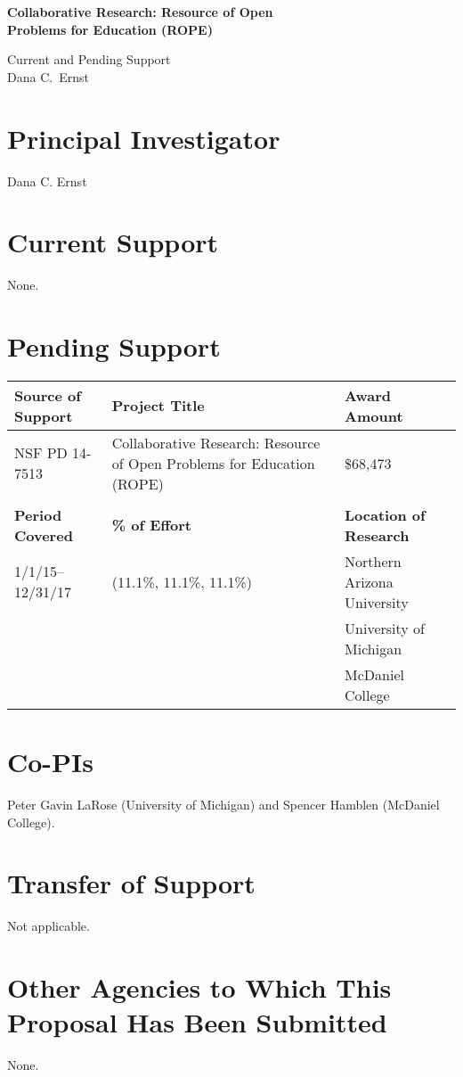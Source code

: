 \documentclass[11pt]{article}
\begin{document}
\begin{center}
{\Large \textbf{Collaborative Research: Resource of Open\\
Problems for Education (ROPE)}}

\bigskip

{\Large Current and Pending Support}\\
\smallskip
Dana C.~Ernst
\end{center}

\thispagestyle{empty}

\section{Principal Investigator}

\noindent Dana C. Ernst

\section{Current Support}

\noindent None.

\section{Pending Support}

\begin{tabularx}{6.4in}{@{}lXl}
\hline
\textbf{Source of Support} & \textbf{Project Title} & \textbf{Award Amount} \\
\hline
NSF PD 14-7513 & Collaborative Research: Resource of Open Problems for Education (ROPE) & \$68,473\\
\\
\hline
\textbf{Period Covered} & \textbf{\% of Effort} & \textbf{Location of Research} \\
\hline
1/1/15--12/31/17 \ \ & (11.1\%, 11.1\%, 11.1\%) \ & Northern Arizona University \\ 
&& University of Michigan \\
&& McDaniel College\\
\end{tabularx}

\section{Co-PIs}

\noindent Peter Gavin LaRose (University of Michigan) and Spencer Hamblen (McDaniel College).

\section{Transfer of Support}

\noindent Not applicable.

\section{Other Agencies to Which This Proposal Has Been Submitted}

None.
\end{document}
